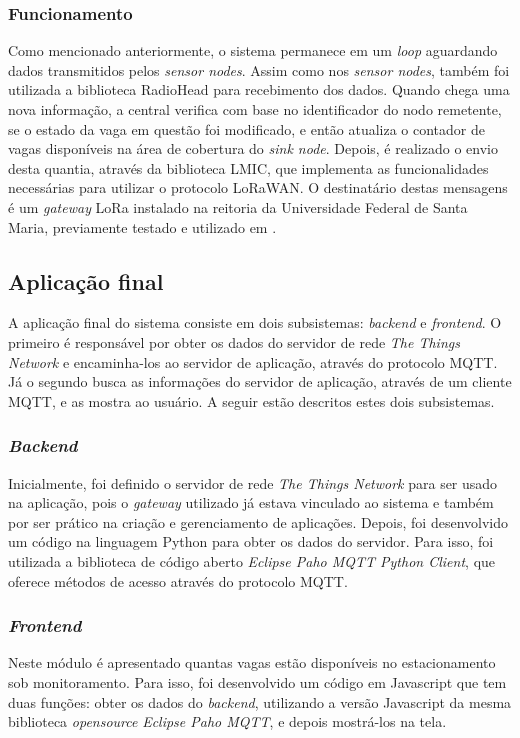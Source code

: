 \documentclass[oneside,openright,12pt]{ufsm_2015} %
\begin{document}
    \subsubsection{Funcionamento}
    Como mencionado anteriormente, o sistema permanece em um \textit{loop} aguardando dados transmitidos pelos \textit{sensor nodes}.
    Assim como nos \textit{sensor nodes}, também foi utilizada a biblioteca RadioHead para recebimento dos dados. Quando chega uma nova informação, a central verifica com base no identificador do nodo remetente, se o estado da vaga em questão foi modificado, e então atualiza o contador de vagas disponíveis na área de cobertura do \textit{sink node}. Depois, é realizado o envio desta quantia, através da biblioteca LMIC, que implementa as funcionalidades necessárias para utilizar o protocolo LoRaWAN. O destinatário destas mensagens é um \textit{gateway} LoRa instalado na reitoria da Universidade Federal de Santa Maria, previamente testado e utilizado em \cite{tcc:matheus-neis}.
    
    
    \subsection{Aplicação final}
    A aplicação final do sistema consiste em dois subsistemas: \textit{backend} e \textit{frontend}. O primeiro é responsável por obter os dados do servidor de rede \textit{The Things Network} e encaminha-los ao servidor de aplicação, através do protocolo MQTT. Já o segundo busca as informações do servidor de aplicação, através de um cliente MQTT, e as mostra ao usuário.
    A seguir estão descritos estes dois subsistemas.
    
    \subsubsection{\textit{Backend}}
    Inicialmente, foi definido o servidor de rede \textit{The Things Network} para ser usado na aplicação, pois o \textit{gateway} utilizado já estava vinculado ao sistema e também por ser prático na criação e gerenciamento de aplicações. Depois, foi desenvolvido um código na linguagem Python para obter os dados do servidor. Para isso, foi utilizada a biblioteca de código aberto \textit{Eclipse Paho MQTT Python Client}, que oferece métodos de acesso através do protocolo MQTT. 
    
    \subsubsection{\textit{Frontend}}
    Neste módulo é apresentado quantas vagas estão disponíveis no estacionamento sob monitoramento. Para isso, foi desenvolvido um código em Javascript que tem duas funções: obter os dados do \textit{backend}, utilizando a versão Javascript da mesma biblioteca \textit{opensource} \textit{Eclipse Paho MQTT}, e depois mostrá-los na tela. 
    
\end{document}
